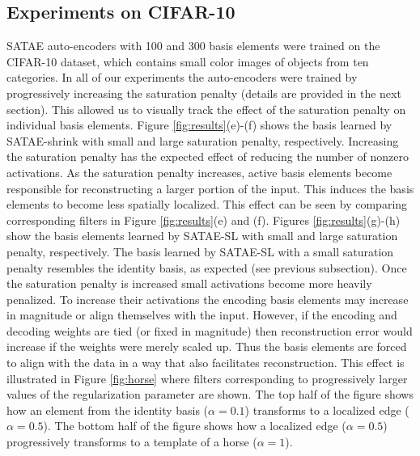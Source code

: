\documentclass{article} %
\begin{document}
\subsection{Experiments on CIFAR-10}
SATAE auto-encoders with 100 and 300 basis elements were trained on the CIFAR-10 dataset, which contains small color images of objects from ten categories. In all of our experiments the auto-encoders were trained by progressively increasing the saturation penalty (details are provided in the next section). This allowed us to visually track the effect of the saturation penalty on individual basis elements. Figure \ref{fig:results}(e)-(f) shows the basis learned by SATAE-shrink with small and large saturation penalty, respectively. Increasing the saturation penalty has the expected effect of reducing the number of nonzero activations. As the saturation penalty increases, active basis elements become responsible for reconstructing a larger portion of the input. This induces the basis elements to become less spatially localized. This effect can be seen by comparing corresponding filters in Figure \ref{fig:results}(e) and (f). Figures \ref{fig:results}(g)-(h)  show the basis elements learned by SATAE-SL with small and large saturation penalty, respectively. The basis learned by SATAE-SL with a small saturation penalty resembles the identity basis, as expected (see previous subsection). Once the saturation penalty is increased small activations become more heavily penalized. To increase their activations the encoding basis elements may increase in magnitude or align themselves with the input. However, if the encoding and decoding weights are tied (or fixed in magnitude) then reconstruction error would increase if the weights were merely scaled up. Thus the basis elements are forced to align with the data in a way that also facilitates reconstruction. This effect is illustrated in Figure \ref{fig:horse} where filters corresponding to progressively larger values of the regularization parameter are shown. The top half of the figure shows how an element from the identity basis ($\alpha=0.1$) transforms to a localized edge ($\alpha=0.5$). The bottom half of the figure shows how a localized edge ($\alpha=0.5$) progressively transforms to a template of a horse ($\alpha=1$).
\end{document}
